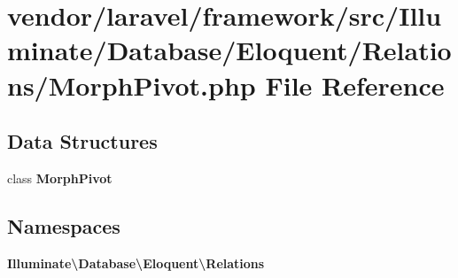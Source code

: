 \section{vendor/laravel/framework/src/\+Illuminate/\+Database/\+Eloquent/\+Relations/\+Morph\+Pivot.php File Reference}
\label{_morph_pivot_8php}
\subsection*{Data Structures}
\begin{DoxyCompactItemize}
\item 
class {\bf Morph\+Pivot}
\end{DoxyCompactItemize}
\subsection*{Namespaces}
\begin{DoxyCompactItemize}
\item 
 {\bf Illuminate\textbackslash{}\+Database\textbackslash{}\+Eloquent\textbackslash{}\+Relations}
\end{DoxyCompactItemize}

